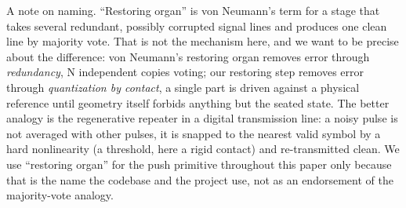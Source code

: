 \documentclass[11pt]{article}
\begin{document}
A note on naming. ``Restoring organ'' is von Neumann's term
\citep{vonneumann1956} for a stage that takes several redundant, possibly
corrupted signal lines and produces one clean line by majority vote. That
is not the mechanism here, and we want to be precise about the difference:
von Neumann's restoring organ removes error through \emph{redundancy}, N
independent copies voting; our restoring step removes error through
\emph{quantization by contact}, a single part is driven against a physical
reference until geometry itself forbids anything but the seated state. The
better analogy is the regenerative repeater in a digital transmission line:
a noisy pulse is not averaged with other pulses, it is snapped to the
nearest valid symbol by a hard nonlinearity (a threshold, here a rigid
contact) and re-transmitted clean. We use ``restoring organ'' for the
push primitive throughout this paper only because that is the name the
codebase and the project use, not as an endorsement of the majority-vote
analogy.
\end{document}
